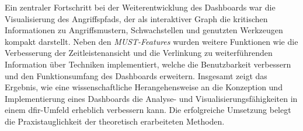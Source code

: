 Ein zentraler Fortschritt bei der Weiterentwicklung des Dashboards war die Visualisierung des Angriffspfads, der als interaktiver Graph die kritischen Informationen zu Angriffsmustern, Schwachstellen und genutzten Werkzeugen kompakt darstellt. Neben den \textit{MUST-Features} wurden weitere Funktionen wie die Verbesserung der Zeitleistenansicht und die Verlinkung zu weiterführenden Information über Techniken implementiert, welche die Benutzbarkeit verbessern und den Funktionsumfang des Dashboards erweitern. Insgesamt zeigt das Ergebnis, wie eine wissenschaftliche Herangehensweise an die Konzeption und Implementierung eines Dashboards die Analyse- und Visualisierungsfähigkeiten in einem \gls{dfir}-Umfeld erheblich verbessern kann. Die erfolgreiche Umsetzung belegt die Praxistauglichkeit der theoretisch erarbeiteten Methoden.

